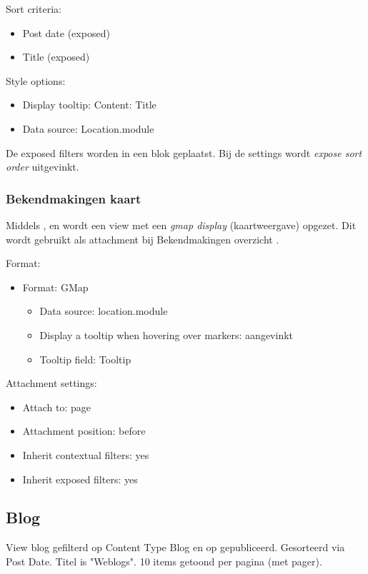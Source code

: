 Sort criteria:
\begin{itemize}
\item Post date (exposed)
\item Title (exposed)
\end{itemize}

Style options:
\begin{itemize}
\item Display tooltip: Content: Title
\item Data source: Location.module
\end{itemize}

De exposed filters worden in een blok geplaatst. Bij de settings wordt \emph{expose sort order} uitgevinkt.

\subsubsection{Bekendmakingen kaart}\label{bekendmakingen-markers}

Middels ,  en  wordt een view met een \emph{gmap display} (kaartweergave) opgezet. Dit wordt gebruikt als attachment bij Bekendmakingen overzicht .

Format:
\begin{itemize}
\item Format: GMap
\begin{itemize}
\item Data source: location.module
\item Display a tooltip when hovering over markers: aangevinkt
\item Tooltip field: Tooltip
\end{itemize}
\end{itemize}

Attachment settings:
\begin{itemize}
\item Attach to: page
\item Attachment position: before
\item Inherit contextual filters: yes
\item Inherit exposed filters: yes
\end{itemize}

\subsection{Blog}
View blog gefilterd op Content Type Blog en op gepubliceerd. Gesorteerd via Post Date. Titel is "Weblogs". 10 items getoond per pagina (met pager).

